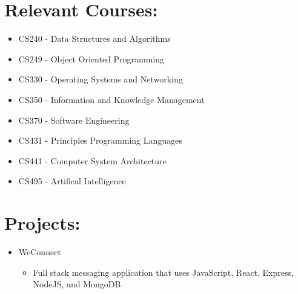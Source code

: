 \documentclass[12pt, oneside, a4paper]{article}
\begin{document}
    \section*{Relevant Courses:}
    \begin{itemize}
    \scriptsize
        \item CS240 - Data Structures and Algorithms
        \item CS249 - Object Oriented Programming
        \item CS330 - Operating Systems and Networking
        \item CS350 - Information and Knowledge Management
        \item CS370 - Software Engineering
        \item CS431 - Principles Programming Languages
        \item CS441 - Computer System Architecture
        \item CS495 - Artifical Intelligence
    \end{itemize}

    \section*{Projects:}
    \begin{itemize}
    \scriptsize

        \item WeConnect
            \begin{itemize}
                \item Full stack messaging application that uses JavaScript, React, Express, NodeJS, and MongoDB
            \end{itemize}
    \end{itemize} 
   
\end{document}
